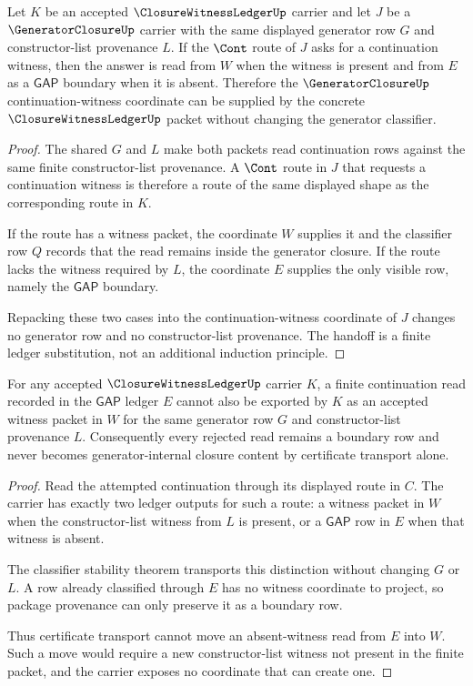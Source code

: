 \begin{theorem}
\label{thm:closure-witness-ledger-generatorclosure-handoff}
Let $K$ be an accepted $\ClosureWitnessLedgerUp$ carrier and let $J$ be a $\GeneratorClosureUp$ carrier with the same displayed generator row $G$ and constructor-list provenance $L$. If the $\Cont$ route of $J$ asks for a continuation witness, then the answer is read from $W$ when the witness is present and from $E$ as a $\mathsf{GAP}$ boundary when it is absent. Therefore the $\GeneratorClosureUp$ continuation-witness coordinate can be supplied by the concrete $\ClosureWitnessLedgerUp$ packet without changing the generator classifier.
\end{theorem}
\begin{proof}
The shared $G$ and $L$ make both packets read continuation rows against the same finite constructor-list provenance. A $\Cont$ route in $J$ that requests a continuation witness is therefore a route of the same displayed shape as the corresponding route in $K$.

If the route has a witness packet, the coordinate $W$ supplies it and the classifier row $Q$ records that the read remains inside the generator closure. If the route lacks the witness required by $L$, the coordinate $E$ supplies the only visible row, namely the $\mathsf{GAP}$ boundary.

Repacking these two cases into the continuation-witness coordinate of $J$ changes no generator row and no constructor-list provenance. The handoff is a finite ledger substitution, not an additional induction principle.
\end{proof}

\begin{theorem}
\label{thm:closure-witness-ledger-gap-nonescape}
For any accepted $\ClosureWitnessLedgerUp$ carrier $K$, a finite continuation read recorded in the $\mathsf{GAP}$ ledger $E$ cannot also be exported by $K$ as an accepted witness packet in $W$ for the same generator row $G$ and constructor-list provenance $L$. Consequently every rejected read remains a boundary row and never becomes generator-internal closure content by certificate transport alone.
\end{theorem}
\begin{proof}
Read the attempted continuation through its displayed route in $C$. The carrier has exactly two ledger outputs for such a route: a witness packet in $W$ when the constructor-list witness from $L$ is present, or a $\mathsf{GAP}$ row in $E$ when that witness is absent.

The classifier stability theorem transports this distinction without changing $G$ or $L$. A row already classified through $E$ has no witness coordinate to project, so package provenance can only preserve it as a boundary row.

Thus certificate transport cannot move an absent-witness read from $E$ into $W$. Such a move would require a new constructor-list witness not present in the finite packet, and the carrier exposes no coordinate that can create one.
\end{proof}

